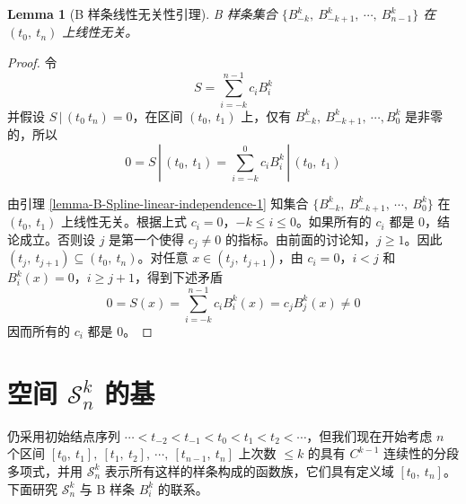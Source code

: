 \documentclass[a4paper]{article}
\newtheorem{lemma}{Lemma}
\begin{document}
    \begin{lemma}[B 样条线性无关性引理]
    \label{lemma-B-Spline-linear-independence-2}
        B 样条集合 $\{B_{-k}^{k},\ B_{-k+1}^{k},\ \cdots,\ B_{n-1}^{k}\}$ 在 $(t_0,\ t_n)$ 上线性无关。
    \end{lemma}
    \begin{proof}[Proof]
        令 
        \begin{equation}
            S = \sum_{i = -k}^{n-1} c_i B_i^k
        \end{equation}
        并假设 $S\,|\,(t_0\ t_n) = 0$，在区间 $(t_0,\ t_1)$ 上，仅有 $B_{-k}^{k},\ B_{-k+1}^{k},\ \cdots, B_{0}^{k}$ 是非零的，所以
        \begin{equation}
            0 = S\,|\,(t_0,\ t_1) = \sum_{i = -k}^{0} c_i B_i^k\,|\,(t_0,\ t_1)
        \end{equation}
        
        \noindent 由引理 \ref{lemma-B-Spline-linear-independence-1} 知集合 $\{B_{-k}^{k},\ B_{-k+1}^{k},\ \cdots,\ B_{0}^{k}\}$ 在 $(t_0,\ t_1)$ 上线性无关。根据上式 $c_i = 0$，$-k \leqslant i \leqslant 0$。如果所有的 $c_i$ 都是 $0$，结论成立。否则设 $j$ 是第一个使得 $c_j \neq 0$ 的指标。由前面的讨论知，$j \geqslant 1$。因此 $(t_{j},\ t_{j+1}) \subseteq (t_0,\ t_n)$。对任意 $x \in (t_{j},\ t_{j+1})$，由 $c_i = 0$，$i < j$ 和 $B_i^k(x) = 0$，$i \geqslant j+1$，得到下述矛盾
        \begin{equation}
            0 = S(x) = \sum_{i = -k}^{n-1} c_i B_i^k(x) =  c_j B_j^k(x) \neq 0
        \end{equation}
        因而所有的 $c_i$ 都是 $0$。
    \end{proof}


\section{空间 $\mathcal{S}_n^k$ 的基}

    仍采用初始结点序列 $\cdots < t_{-2} < t_{-1} < t_{0} < t_{1} < t_{2} < \cdots$，但我们现在开始考虑 $n$ 个区间 $[t_0,\ t_1],\ [t_1,\ t_2],\ \cdots,\ [t_{n-1},\ t_{n}]$ 上次数 $\leqslant k$ 的具有 $C^{k-1}$ 连续性的分段多项式，并用 $\mathcal{S}_n^k$ 表示所有这样的样条构成的函数族，它们具有定义域 $[t_0,\ t_n]$。下面研究 $\mathcal{S}_n^k$ 与 B 样条 $B_i^k$ 的联系。
\end{document}
